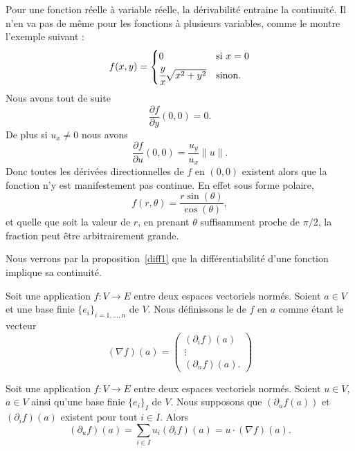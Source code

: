 \begin{example}
	Pour une fonction réelle à variable réelle, la dérivabilité entraine la continuité. Il n'en va pas de même pour les fonctions à plusieurs variables, comme le montre l'exemple suivant :
	\begin{equation}
		f(x,y)=\begin{cases}
			0                              & \text{si } x=0 \\
			\cfrac{ y }{ x }\sqrt{x^2+y^2} & \text{sinon.}
		\end{cases}
	\end{equation}
	Nous avons tout de suite
	\begin{equation}
		\frac{ \partial f }{ \partial y }(0,0)=0.
	\end{equation}
	De plus si \( u_x\neq 0\) nous avons
	\begin{equation}
		\frac{ \partial f }{ \partial u }(0,0)=\frac{ u_y }{ u_x }\| u \|.
	\end{equation}
	Donc toutes les dérivées directionnelles de \( f\) en \( (0,0)\) existent alors que la fonction n'y est manifestement pas continue. En effet sous forme polaire,
	\begin{equation}
		f(r,\theta)=\frac{ r\sin(\theta) }{ \cos(\theta) },
	\end{equation}
	et quelle que soit la valeur de \( r\), en prenant \( \theta\) suffisamment proche de \( \pi/2\), la fraction peut être arbitrairement grande.

	Nous verrons par la proposition~\ref{diff1} que la différentiabilité d'une fonction implique sa continuité.
\end{example}

\begin{definition}[gradient]		\label{DEFooWZGTooKCWBJn}
	Soit une application \(f \colon V\to E  \) entre deux espaces vectoriels normés. Soient \( a\in V\) et une base finie \( \{ e_i \}_{i=1,\ldots,n}\) de \( V\). Nous définissons le  de \( f\) en \( a\) comme étant le vecteur
	\begin{equation}
		(\nabla f)(a)=\begin{pmatrix}
			(\partial_if)(a) \\
			\vdots           \\
			(\partial_nf)(a).
		\end{pmatrix}
	\end{equation}
\end{definition}

\begin{proposition}		\label{PROPooYCLBooOLoDnM}
	Soit une application \(f \colon V\to E  \) entre deux espaces vectoriels normés. Soient \( u\in V\), \( a\in V\) ainsi qu'une base finie \( \{ e_i \}_I\) de \( V\). Nous supposons que \( (\partial_uf(a)) \) et \( (\partial_if)(a)\) existent pour tout \( i\in I\). Alors
	\begin{equation}
		(\partial_uf)(a)=\sum_{i\in I}u_i(\partial_if)(a)=u\cdot(\nabla f)(a).
	\end{equation}
\end{proposition}


